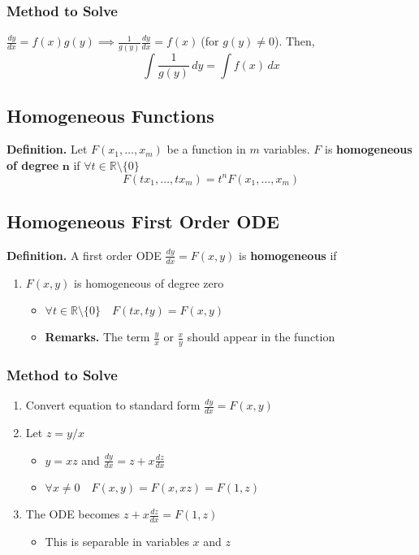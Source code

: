 \documentclass[../ma2002_notes.tex]{subfiles}
\begin{document}
\subsubsection{Method to Solve}
\(\displaystyle\frac{dy}{dx}=f(x)g(y)\implies\frac{1}{g(y)}\frac{dy}{dx}=f(x)\ \)(for \(g(y)\ne0\)). Then,
\[\int\frac{1}{g(y)}\,dy=\int f(x)\,dx\]

\subsection{Homogeneous Functions}
\textbf{Definition.} Let \(F(x_1,\ldots,x_m)\) be a function in \(m\) variables. \(F\) is \textbf{homogeneous of degree} \(\pmb{n}\) if \(\forall t\in\mathbb{R}\setminus\{0\}\)
\[F(tx_1,\ldots,tx_m)=t^nF(x_1,\ldots,x_m)\]

\subsection{Homogeneous First Order ODE}
\textbf{Definition.} A first order ODE \(\displaystyle\frac{dy}{dx}=F(x,y)\) is \textbf{homogeneous} if
\begin{enumerate}
	\item\(F(x,y)\) is homogeneous of degree zero
	\begin{itemize}
		\item\(\forall t\in\mathbb{R}\setminus\{0\}\quad F(tx,ty)=F(x,y)\)
		\item\textbf{Remarks.} The term \(\displaystyle\frac{y}{x}\) or \(\displaystyle\frac{x}{y}\) should appear in the function
	\end{itemize}
\end{enumerate}

\subsubsection{Method to Solve}
\begin{enumerate}
	\item Convert equation to standard form \(\displaystyle\frac{dy}{dx}=F(x,y)\)
	\item Let \(z=y/x\)
	\begin{itemize}
		\item\(y=xz\) and \(\displaystyle\frac{dy}{dx}=z+x\frac{dz}{dx}\)
		\item\(\forall x\ne0\quad F(x,y)=F(x,xz)=F(1,z)\)
	\end{itemize}
	\item The ODE becomes \(\displaystyle z+x\frac{dz}{dx}=F(1,z)\)
	\begin{itemize}
		\item This is separable in variables \(x\) and \(z\)
	\end{itemize}
\end{enumerate}
\end{document}
